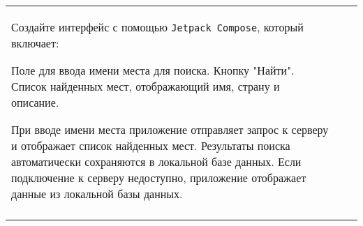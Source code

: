 \documentclass[a4paper]{article}
\begin{document}
\begin{tabular}{!{\vrule width 2pt}p{5cm}|p{6cm}|p{4cm}!{\vrule width 2pt}}
{\begin{minipage}{16cm}
\begin{enumerate}
Создайте интерфейс с помощью \texttt{Jetpack Compose}, который включает:

Поле для ввода имени места для поиска.
Кнопку "Найти".
Список найденных мест, отображающий имя, страну и описание.

При вводе имени места приложение отправляет запрос к серверу и отображает список найденных мест.
Результаты поиска автоматически сохраняются в локальной базе данных.
Если подключение к серверу недоступно, приложение отображает данные из локальной базы данных.
\end{enumerate}

\vspace{0.2cm}
    
\end{minipage}
}
\\
\end{tabular}

\newpage
\end{document}
